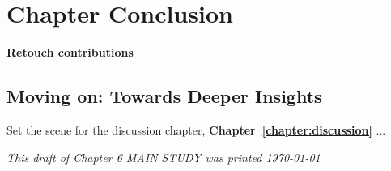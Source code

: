 \section{Chapter Conclusion}
\label{main-study:chapter-summary}

\textbf{Retouch contributions}

\subsection{Moving on: Towards Deeper Insights}

Set the scene for the discussion chapter, \textbf{Chapter~\ref{chapter:discussion}} ...


\textit{This draft of Chapter 6 MAIN STUDY was printed \today}



 


